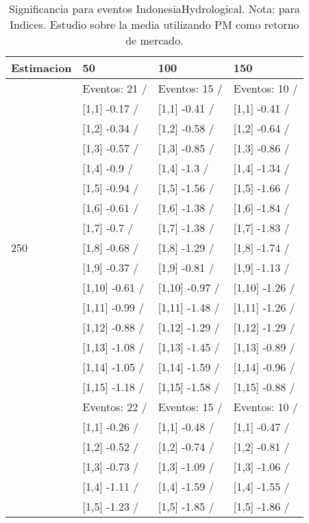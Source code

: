 \begin{table}

\caption{Significancia para eventos IndonesiaHydrological. Nota: para Indices. Estudio sobre la media utilizando PM como retorno de mercado.}
\centering
\begin{tabular}[t]{llll}
\toprule
Estimacion & 50 & 100 & 150\\
\midrule
 & Eventos:  21 / & Eventos:  15 / & Eventos:  10 /\\
 & {}[1,1] -0.17  / & {}[1,1] -0.41  / & {}[1,1] -0.41  /\\
 & {}[1,2] -0.34  / & {}[1,2] -0.58  / & {}[1,2] -0.64  /\\
 & {}[1,3] -0.57  / & {}[1,3] -0.85  / & {}[1,3] -0.86  /\\
 & {}[1,4] -0.9  / & {}[1,4] -1.3  / & {}[1,4] -1.34  /\\
\addlinespace
 & {}[1,5] -0.94  / & {}[1,5] -1.56  / & {}[1,5] -1.66  /\\
 & {}[1,6] -0.61  / & {}[1,6] -1.38  / & {}[1,6] -1.84  /\\
 & {}[1,7] -0.7  / & {}[1,7] -1.38  / & {}[1,7] -1.83  /\\
250 & {}[1,8] -0.68  / & {}[1,8] -1.29  / & {}[1,8] -1.74  /\\
 & {}[1,9] -0.37  / & {}[1,9] -0.81  / & {}[1,9] -1.13  /\\
\addlinespace
 & {}[1,10] -0.61  / & {}[1,10] -0.97  / & {}[1,10] -1.26  /\\
 & {}[1,11] -0.99  / & {}[1,11] -1.48  / & {}[1,11] -1.26  /\\
 & {}[1,12] -0.88  / & {}[1,12] -1.29  / & {}[1,12] -1.29  /\\
 & {}[1,13] -1.08  / & {}[1,13] -1.45  / & {}[1,13] -0.89  /\\
 & {}[1,14] -1.05  / & {}[1,14] -1.59  / & {}[1,14] -0.96  /\\
\addlinespace
 & {}[1,15] -1.18  / & {}[1,15] -1.58  / & {}[1,15] -0.88  /\\
 & Eventos:  22 / & Eventos:  15 / & Eventos:  10 /\\
 & {}[1,1] -0.26  / & {}[1,1] -0.48  / & {}[1,1] -0.47  /\\
 & {}[1,2] -0.52  / & {}[1,2] -0.74  / & {}[1,2] -0.81  /\\
 & {}[1,3] -0.73  / & {}[1,3] -1.09  / & {}[1,3] -1.06  /\\
\addlinespace
 & {}[1,4] -1.11  / & {}[1,4] -1.59  / & {}[1,4] -1.55  /\\
 & {}[1,5] -1.23  / & {}[1,5] -1.85  / & {}[1,5] -1.86  /\\

\end{tabular}
\end{table}
